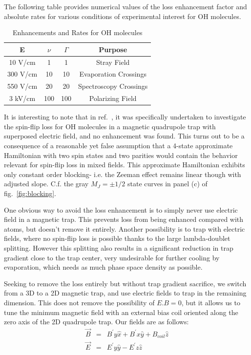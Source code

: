 \documentclass[%
 reprint,
 amsmath,amssymb,
 aps,
prl,
]{revtex4-1}
\begin{document}
The following table provides numerical values of the loss enhancement factor and absolute rates for various conditions of experimental interest for OH molecules.

\begin{table}[h!]
\caption{Enhancements and Rates for OH molecules}
\label{tab:rates}
\begin{tabular}{c|ccc}
\toprule
E & $\nu$ & $\Gamma$ & Purpose \\
\toprule
10 V/cm & 1 & 1 & Stray Field \\
300 V/cm & 10 & 10 & Evaporation Crossings\\
550 V/cm & 20 & 20 & Spectroscopy Crossings\\
3 kV/cm & 100 & 100 & Polarizing Field\\
\toprule
\end{tabular}
\end{table}

It is interesting to note that in ref.~\cite{Lara2008}, it was specifically undertaken to investigate the spin-flip loss for OH molecules in a magnetic quadrupole trap with superposed electric field, and no enhancement was found. This turns out to be a consequence of a reasonable yet false assumption that a 4-state approximate Hamiltonian with two spin states and two parities would contain the behavior relevant for spin-flip loss in mixed fields. This approximate Hamiltonian exhibits only constant order blocking- i.e. the Zeeman effect remains linear though with adjusted slope. C.f. the gray $M_J=\pm1/2$ state curves in panel (c) of fig.~\ref{fig:blocking}.



One obvious way to avoid the loss enhancement is to simply never use electric field in a magnetic trap. This prevents loss from being enhanced compared with atoms, but doesn't remove it entirely. Another possibility is to trap with electric fields, where no spin-flip loss is possible thanks to the large lambda-doublet splitting. However this splitting also results in a significant reduction in trap gradient close to the trap center, very undesirable for further cooling by evaporation, which needs as much phase space density as possible.

Seeking to remove the loss entirely but without trap gradient sacrifice, we switch from a 3D to a 2D magnetic trap, and use electric fields to trap in the remaining dimension. This does not remove the possibility of $E.B=0$, but it allows us to tune the minimum magnetic field with an external bias coil oriented along the zero axis of the 2D quadrupole trap.  Our fields are as follows:
\begin{eqnarray}
\vec{B} &=&  B^\prime y\hat{x}+ B^\prime x\hat{y} + B_{coil} \hat{z}\\
\vec{E} &=&  E^\prime y\hat{y}-  E^\prime z\hat{z}
\end{eqnarray}
\end{document}
